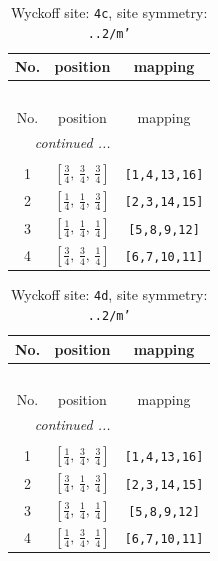 \documentclass[fleqn,8pt]{jsarticle}
\begin{document}
\renewcommand{\arraystretch}{1.2}
\begin{longtable}{ccc}
\caption{Wyckoff site: {\tt 4c}, site symmetry: {\tt ..2/m'}}
 \\
 \hline \hline
No. & position & mapping \\ \hline \endfirsthead

\multicolumn{2}{l}{\tablename\ \thetable{}} \\
 \hline \hline
No. & position & mapping \\ \hline \endhead

 \hline \hline
\multicolumn{2}{r}{\footnotesize\it continued ...} \\ \endfoot

 \hline \hline
\multicolumn{2}{r}{} \\ \endlastfoot

1 & $\left[ \frac{3}{4},\, \frac{3}{4},\, \frac{3}{4} \right]$ & {\tt [1,4,13,16]} \\ \hline
2 & $\left[ \frac{1}{4},\, \frac{1}{4},\, \frac{3}{4} \right]$ & {\tt [2,3,14,15]} \\ \hline
3 & $\left[ \frac{1}{4},\, \frac{1}{4},\, \frac{1}{4} \right]$ & {\tt [5,8,9,12]} \\ \hline
4 & $\left[ \frac{3}{4},\, \frac{3}{4},\, \frac{1}{4} \right]$ & {\tt [6,7,10,11]} \\
\end{longtable}
\renewcommand{\arraystretch}{1.2}
\begin{longtable}{ccc}
\caption{Wyckoff site: {\tt 4d}, site symmetry: {\tt ..2/m'}}
 \\
 \hline \hline
No. & position & mapping \\ \hline \endfirsthead

\multicolumn{2}{l}{\tablename\ \thetable{}} \\
 \hline \hline
No. & position & mapping \\ \hline \endhead

 \hline \hline
\multicolumn{2}{r}{\footnotesize\it continued ...} \\ \endfoot

 \hline \hline
\multicolumn{2}{r}{} \\ \endlastfoot

1 & $\left[ \frac{1}{4},\, \frac{3}{4},\, \frac{3}{4} \right]$ & {\tt [1,4,13,16]} \\ \hline
2 & $\left[ \frac{3}{4},\, \frac{1}{4},\, \frac{3}{4} \right]$ & {\tt [2,3,14,15]} \\ \hline
3 & $\left[ \frac{3}{4},\, \frac{1}{4},\, \frac{1}{4} \right]$ & {\tt [5,8,9,12]} \\ \hline
4 & $\left[ \frac{1}{4},\, \frac{3}{4},\, \frac{1}{4} \right]$ & {\tt [6,7,10,11]} \\
\end{longtable}
\end{document}
